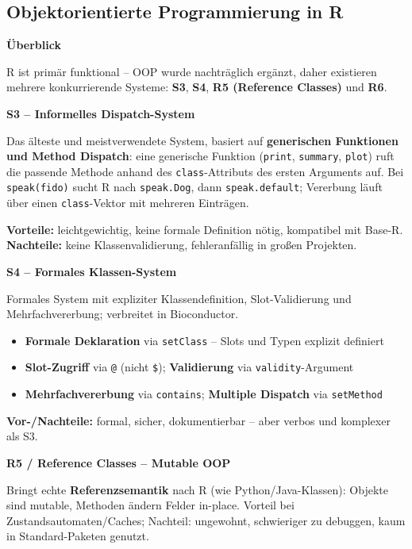 \newpage

\subsection{Objektorientierte Programmierung in R}

\textbf{Überblick}

R ist primär funktional -- OOP wurde nachträglich ergänzt, daher existieren mehrere konkurrierende Systeme: \textbf{S3}, \textbf{S4}, \textbf{R5 (Reference Classes)} und \textbf{R6}.

\textbf{S3 -- Informelles Dispatch-System}

Das älteste und meistverwendete System, basiert auf \textbf{generischen Funktionen und Method Dispatch}: eine generische Funktion (\texttt{print}, \texttt{summary}, \texttt{plot}) ruft die passende Methode anhand des \texttt{class}-Attributs des ersten Arguments auf. Bei \texttt{speak(fido)} sucht R nach \texttt{speak.Dog}, dann \texttt{speak.default}; Vererbung läuft über einen \texttt{class}-Vektor mit mehreren Einträgen.

\textbf{Vorteile:} leichtgewichtig, keine formale Definition nötig, kompatibel mit Base-R. \textbf{Nachteile:} keine Klassenvalidierung, fehleranfällig in großen Projekten.

\textbf{S4 -- Formales Klassen-System}

Formales System mit expliziter Klassendefinition, Slot-Validierung und Mehrfachvererbung; verbreitet in Bioconductor.

\begin{itemize}[leftmargin=1.5em,noitemsep]
  \item \textbf{Formale Deklaration} via \texttt{setClass} -- Slots und Typen explizit definiert
  \item \textbf{Slot-Zugriff} via \texttt{@} (nicht \texttt{\$}); \textbf{Validierung} via \texttt{validity}-Argument
  \item \textbf{Mehrfachvererbung} via \texttt{contains}; \textbf{Multiple Dispatch} via \texttt{setMethod}
\end{itemize}
\textbf{Vor-/Nachteile:} formal, sicher, dokumentierbar -- aber verbos und komplexer als S3.

\textbf{R5 / Reference Classes -- Mutable OOP}

Bringt echte \textbf{Referenzsemantik} nach R (wie Python/Java-Klassen): Objekte sind mutable, Methoden ändern Felder in-place. Vorteil bei Zustandsautomaten/Caches; Nachteil: ungewohnt, schwieriger zu debuggen, kaum in Standard-Paketen genutzt.


